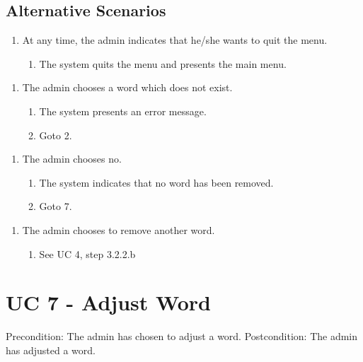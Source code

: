 \documentclass[12pt, letterpaper]{article}
\begin{document}
\subsection{Alternative Scenarios}
\begin{enumerate}[label=a*.]
	\item At any time, the admin indicates that he/she wants to quit the menu.
	\begin{enumerate}[label=a*.1.]
		\item The system quits the menu and presents the main menu.
	\end{enumerate}
\end{enumerate}
\begin{enumerate}[label=3.1.]
	\item The admin chooses a word which does not exist. 
	\begin{enumerate}[label=3.1.\arabic*]
		\item The system presents an error message.
		\item Goto 2.
	\end{enumerate}
\end{enumerate}
\begin{enumerate}[label=4.1.]
	\item The admin chooses no. 
	\begin{enumerate}[label=4.1.\arabic*]
		\item The system indicates that no word has been removed.
		\item Goto 7.
	\end{enumerate}
\end{enumerate}
\begin{enumerate}[label=7.1.]
	\item The admin chooses to remove another word. 
	\begin{enumerate}[label=7.1.\arabic*]
		\item See UC 4, step 3.2.2.b
	\end{enumerate}
\end{enumerate}
\section{UC 7 - Adjust Word}
Precondition: The admin has chosen to adjust a word.
\newline
Postcondition: The admin has adjusted a word.
\end{document}
